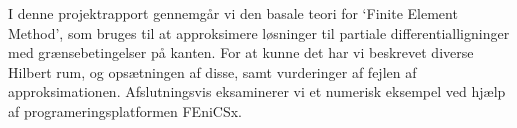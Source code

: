 I denne projektrapport gennemgår vi den basale teori 
for 
`Finite Element Method', som bruges til at approksimere løsninger til partiale differentialligninger med grænsebetingelser på kanten.
For at kunne det har vi beskrevet diverse Hilbert rum, og opsætningen af disse,
samt vurderinger af fejlen af approksimationen.
Afslutningsvis eksaminerer vi et numerisk eksempel ved hjælp af programeringsplatformen FEniCSx.